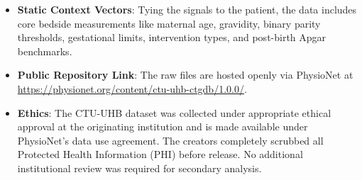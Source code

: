 \documentclass[conference]{IEEEtran}
\begin{document}
\begin{itemize}
    \item \textbf{Static Context Vectors}: Tying the signals to the patient, the data includes core bedside measurements like maternal age, gravidity, binary parity thresholds, gestational limits, intervention types, and post-birth Apgar benchmarks.
    \item \textbf{Public Repository Link}: The raw files are hosted openly via PhysioNet at \url{https://physionet.org/content/ctu-uhb-ctgdb/1.0.0/}.
    \item \textbf{Ethics}: The CTU-UHB dataset was collected under appropriate
    ethical approval at the originating institution and is made available under
    PhysioNet's data use agreement. The creators completely scrubbed all Protected Health Information (PHI) before release. No additional institutional review was required for secondary
    analysis.
\end{itemize}

\begin{table}[htbp]
\caption{\textsc{Participant Characteristics of the CTU-UHB Cohort ($n=552$)}}
\label{tab:ctu_characteristics}
\centering
{}
\end{table}
\end{document}

